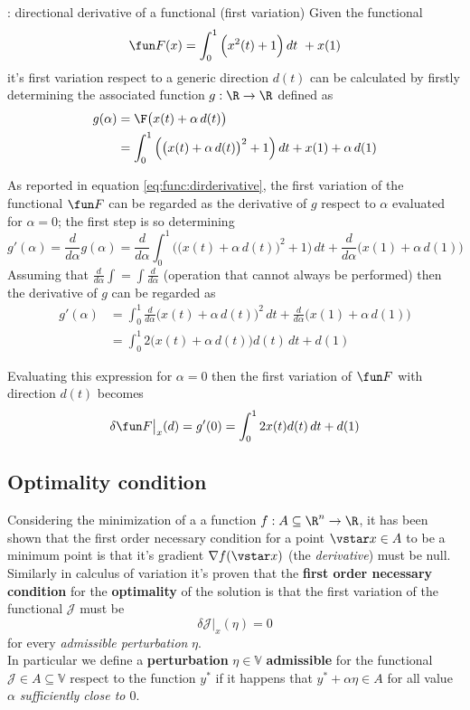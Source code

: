 	
	\begin{example}{: directional derivative of a functional (first variation)}
		Given the functional
		\[ \fun F(x) = \int_0^1 \Big(x^2(t) + 1\Big) \, dt  \ + x(1) \]
		it's first variation respect to a generic direction $d(t)$ can be calculated by firstly determining the associated function $g:\R\rightarrow \R$ defined as
		\begin{align*}
			g(\alpha) &  = \F\big(x(t) + \alpha\, d(t)\big) \\
			& = \int_0^1 \Big( \big(x(t) + \alpha\, d(t)\big)^2 + 1 \Big)\, dt  + x(1) + \alpha\, d(1)
		\end{align*}
	
		As reported in equation \ref{eq:func:dirderivative}, the first variation of the functional $\fun F$ can be regarded as the derivative of $g$ respect to $\alpha$ evaluated for $\alpha = 0$; the first step is so determining
		\[ g'(\alpha ) = \frac{d}{d\alpha}g(\alpha) = \frac d{d\alpha } \int_0^1 \Big( \big(x(t) + \alpha\, d(t)\big)^2 + 1 \Big)\, dt  +  \frac d{d\alpha} \Big(x(1) + \alpha\, d(1)\Big) \]		
		Assuming that $\frac d{d\alpha}\int = \int \frac d{d\alpha}$ (operation that cannot always be performed) then the derivative of $g$ can be regarded as
		\begin{align*}
			g'(\alpha) &= \int_0^1 \frac d{d\alpha} \Big(x(t) + \alpha\, d(t)\Big)^2\, dt + \frac d{d\alpha} \Big(x(1) + \alpha \, d(1)\Big) \\
			& = \int_0^1 2\big(x(t) + \alpha\, d(t)\big) d(t)\, dt + d(1) 
		\end{align*}
	
		Evaluating this expression for $\alpha = 0$ then the first variation of $\fun F$ with direction $d(t)$ becomes
		\[ \delta \fun F\big|_x(d) = g'(0) = \int_0^1 2x(t)d(t)\, dt + d(1) \]
	\end{example}
	
	\subsection{Optimality condition}
		Considering the minimization of a a function $f:A\subseteq \R^n\rightarrow \R$, it has been shown that the first order necessary condition for a point $\vstar x \in A$ to be a minimum point is that it's gradient $\nabla f(\vstar x)$ (the \textit{derivative}) must be null. Similarly in calculus of variation it's proven that the \textbf{first order necessary condition} for the \textbf{optimality} of the solution is that the first variation of the functional $\mathcal J$ must be 
		\begin{equation}
			\delta \mathcal J\big|_x(\eta)= 0
		\end{equation}
		for every \textit{admissible perturbation} $\eta$. \\ In particular we define a \textbf{perturbation} $\eta \in \mathds V$ \textbf{admissible} for the functional $\mathcal J \in A\subseteq \mathds V$ respect to the function $y^*$ if it happens that $y^* + \alpha \eta \in A$ for all value $\alpha$ \textit{sufficiently close to $0$}.


